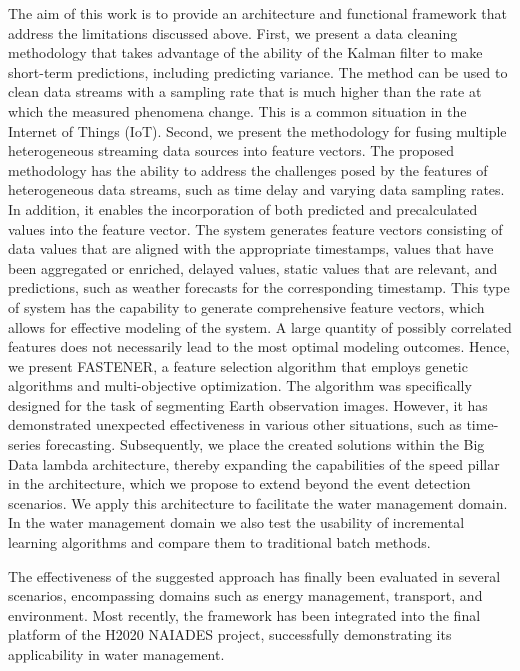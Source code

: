 The aim of this work is to provide an architecture and functional framework that address the limitations discussed above.
First, we present a data cleaning methodology that takes advantage of the ability of the Kalman filter to make short-term predictions, including predicting variance.
The method can be used to clean data streams with a sampling rate that is much higher than the rate at which the measured phenomena change. 
This is a common situation in the Internet of Things (IoT).
Second, we present the methodology for fusing multiple heterogeneous streaming data sources into feature vectors.
The proposed methodology has the ability to address the challenges posed by the features of heterogeneous data streams, such as time delay and varying data sampling rates.
In addition, it enables the incorporation of both predicted and precalculated values into the feature vector.
The system generates feature vectors consisting of data values that are aligned with the appropriate timestamps, values that have been aggregated or enriched, delayed values, static values that are relevant, and predictions, such as weather forecasts for the corresponding timestamp.
This type of system has the capability to generate comprehensive feature vectors, which allows for effective modeling of the system.
A large quantity of possibly correlated features does not necessarily lead to the most optimal modeling outcomes. 
Hence, we present FASTENER, a feature selection algorithm that employs genetic algorithms and multi-objective optimization.
The algorithm was specifically designed for the task of segmenting Earth observation images. 
However, it has demonstrated unexpected effectiveness in various other situations, such as time-series forecasting.
Subsequently, we place the created solutions within the Big Data lambda architecture, thereby expanding the capabilities of the speed pillar in the architecture, which we propose to extend beyond the event detection scenarios. 
We apply this architecture to facilitate the water management domain.
In the water management domain we also test the usability of incremental learning algorithms and compare them to traditional batch methods.

The effectiveness of the suggested approach has finally been evaluated in several scenarios, encompassing domains such as energy management, transport, and environment. 
Most recently, the framework has been integrated into the final platform of the H2020 NAIADES project, successfully demonstrating its applicability in water management.